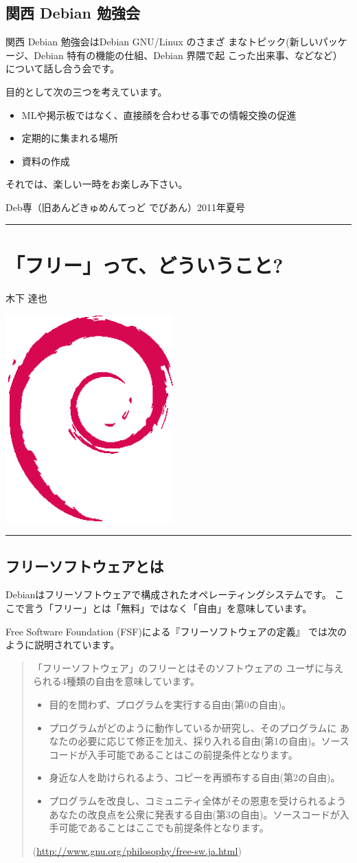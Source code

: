 \documentclass[mingoth,a4paper]{jsarticle}
\renewcommand{\dancersection}[2]{%
\newpage
Deb専（旧あんどきゅめんてっど でびあん）2011年夏号
%
\vspace{0.1mm}\\
{\color{dancerdarkblue}\rule{\hsize}{2mm}}

%
%
\begin{minipage}[t]{0.6\hsize}
\color{dancerdarkblue}
\vspace{1cm}
\section{#1}
\hfill{}#2\\
\end{minipage}
\begin{minipage}[t]{0.4\hsize}
\vspace{-2cm}
\hfill{}\includegraphics[height=8cm]{image200502/openlogo-nd.eps}\\
\vspace{-5cm}
\end{minipage}
%
{\color{dancerlightblue}\rule{0.66\hsize}{2mm}}
%
\vspace{2cm}
}
\begin{document}
\subsection{関西 Debian 勉強会}

 関西 Debian 勉強会はDebian GNU/Linux のさまざ
 まなトピック(新しいパッケージ、Debian 特有の機能の仕組、Debian 界隈で起
 こった出来事、などなど）について話し合う会です。

 目的として次の三つを考えています。
 \begin{itemize}
  \item MLや掲示板ではなく、直接顔を合わせる事での情報交換の促進
  \item 定期的に集まれる場所
  \item 資料の作成
 \end{itemize}

 それでは、楽しい一時をお楽しみ下さい。




\dancersection{「フリー」って、どういうこと?}{木下 達也}

\subsection{フリーソフトウェアとは}

Debianはフリーソフトウェアで構成されたオペレーティングシステムです。
ここで言う「フリー」とは「無料」ではなく「自由」を意味しています。

Free Software Foundation (FSF)による『フリーソフトウェアの定義』
では次のように説明されています。

\begin{quote}
「フリーソフトウェア」のフリーとはそのソフトウェアの
ユーザに与えられる4種類の自由を意味しています。

\begin{itemize}
 \item 目的を問わず、プログラムを実行する自由(第0の自由)。

 \item プログラムがどのように動作しているか研究し、そのプログラムに あなたの必要に応じて修正を加え、採り入れる自由(第1の自由)。ソースコードが入手可能であることはこの前提条件となります。

 \item 身近な人を助けられるよう、コピーを再頒布する自由(第2の自由)。

 \item プログラムを改良し、コミュニティ全体がその恩恵を受けられるよう あなたの改良点を公衆に発表する自由(第3の自由)。ソースコードが入手可能であることはここでも前提条件となります。

\end{itemize}

(\url{http://www.gnu.org/philosophy/free-sw.ja.html})
\end{quote}
\end{document}
